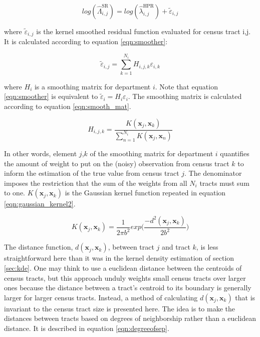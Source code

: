 \documentclass{svjour3}
\begin{document}
\begin{equation}
  \label{eqn:smooth_residual}
  log(\hat\Lambda^{\text{SR}}_{i,j}) = log(\hat\lambda^{\text{HPR}}_{i,j}) + \tilde{\varepsilon}_{i,j}
\end{equation}

\noindent where $\tilde{\varepsilon}_{i,j}$ is the kernel smoothed residual function evaluated for census tract i,j. It is calculated according to equation \ref{eqn:smoother}:

\begin{equation}
  \label{eqn:smoother}
  \tilde{\varepsilon}_{i,j} = \sum_{k=1}^{N_i} H_{i,j,k}\varepsilon_{i,k}
\end{equation}

\noindent where $H_i$ is a smoothing matrix for department $i$. Note that equation \ref{eqn:smoother} is equivalent to $\tilde{\varepsilon}_{i} = H_{i}\varepsilon_{i}$. The smoothing matrix is calculated according to equation \ref{eqn:smooth_mat}.

\begin{equation}
  \label{eqn:smooth_mat}
  H_{i,j,k} = \frac{K(\textbf{x}_j,\textbf{x}_k)}{\sum_{n=1}^{N_i}K(\textbf{x}_j,\textbf{x}_n)}
\end{equation}

\noindent In other words, element $j$,$k$ of the smoothing matrix for department $i$ quantifies the amount of weight to put on the (noisy) observation from census tract $k$ to inform the estimation of the true value from census tract $j$. The denominator imposes the restriction that the sum of the weights from all $N_i$ tracts must sum to one. $K(\textbf{x}_j, \textbf{x}_k)$ is the Gaussian kernel function repeated in equation \ref{eqn:gaussian_kernel2}.

\begin{equation}
  \label{eqn:gaussian_kernel2}
 K(\textbf{x}_j, \textbf{x}_k) = \frac{1}{2\pi b^2}exp\bigg(\frac{-d^2(\textbf{x}_j,\textbf{x}_{k})}{2b^2}\bigg)
\end{equation}

The distance function, $d(\textbf{x}_j,\textbf{x}_{k})$, between tract $j$ and tract $k$, is less straightforward here than it was in the kernel density estimation of section \ref{sec:kde}. One may think to use a euclidean distance between the centroids of census tracts, but this approach unduly weights small census tracts over larger ones because the distance between a tract's centroid to its boundary is generally larger for larger census tracts. Instead, a method of calculating $d(\textbf{x}_j,\textbf{x}_{k})$ that is invariant to the census tract size is presented here. The idea is to make the distances between tracts based on degrees of neighborship rather than a euclidean distance. It is described in equation \ref{eqn:degreeofsep}. 
\end{document}
